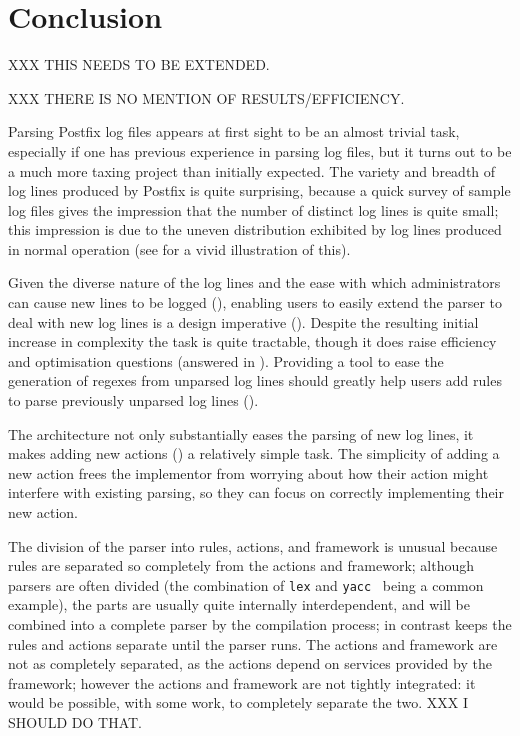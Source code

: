 \chapter{Conclusion}

\label{conclusion}

XXX THIS NEEDS TO BE EXTENDED\@.

XXX THERE IS NO MENTION OF RESULTS/EFFICIENCY\@.

Parsing Postfix log files appears at first sight to be an almost trivial
task, especially if one has previous experience in parsing log files, but
it turns out to be a much more taxing project than initially expected.  The
variety and breadth of log lines produced by Postfix is quite surprising,
because a quick survey of sample log files gives the impression that the
number of distinct log lines is quite small; this impression is due to the
uneven distribution exhibited by log lines produced in normal operation
(see  for a vivid illustration of this).


Given the diverse nature of the log lines and the ease with which
administrators can cause new lines to be logged (), enabling users to easily extend the parser to deal with new
log lines is a design imperative ().  Despite the
resulting initial increase in complexity the task is quite tractable,
though it does raise efficiency and optimisation questions (answered in
).  Providing a tool to ease the generation
of regexes from unparsed log lines should greatly help users add rules
to parse previously unparsed log lines ().


The architecture not only substantially eases the parsing of new log
lines, it makes adding new actions () a
relatively simple task.  The simplicity of adding a new action frees the
implementor from worrying about how their action might interfere with
existing parsing, so they can focus on correctly implementing their new
action.


The division of the parser into rules, actions, and framework is unusual
because rules are separated so completely from the actions and framework;
although parsers are often divided (the combination of \texttt{lex} and
\texttt{yacc}~\cite{lex-and-yacc-book} being a common example), the parts
are usually quite internally interdependent, and will be combined into a
complete parser by the compilation process; in contrast \parsername{} keeps
the rules and actions separate until the parser runs.  The actions and
framework are not as completely separated, as the actions depend on
services provided by the framework; however the actions and framework are
not tightly integrated: it would be possible, with some work, to completely
separate the two.  XXX I SHOULD DO THAT\@.


